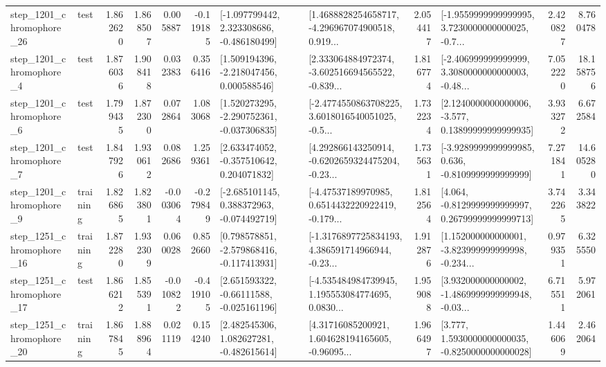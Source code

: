 \begin{tabular}{llrrrrllrlrr}
 step\_1201\_chromophore\_26 &      test &      1.862620 &    1.868507 &      0.005887 & -0.119185 &   [-1.097799442, 2.323308686, -0.486180499] &  [1.4688828254658717, -4.296967074900518, 0.919... &       2.054417 &  [-1.9559999999999995, 3.7230000000000025, -0.7... &            2.420827 &          8.760478 \\
  step\_1201\_chromophore\_4 &      test &      1.876036 &    1.908418 &      0.032383 &  0.356416 &    [1.509194396, -2.218047456, 0.000588546] &  [2.333064884972374, -3.602516694565522, -0.839... &       1.816774 &  [-2.406999999999999, 3.3080000000000003, -0.48... &            7.052220 &         18.158756 \\
  step\_1201\_chromophore\_6 &      test &      1.799435 &    1.872300 &      0.072864 &  1.083068 &   [1.520273295, -2.290752361, -0.037306835] &  [-2.4774550863708225, 3.6018016540051025, -0.5... &       1.732234 &  [2.1240000000000006, -3.577, 0.13899999999999935] &            3.933272 &          6.672584 \\
  step\_1201\_chromophore\_7 &      test &      1.847926 &    1.930612 &      0.082686 &  1.259361 &    [2.633474052, -0.357510642, 0.204071832] &  [4.292866143250914, -0.6202659324475204, -0.23... &       1.735631 &  [-3.9289999999999985, 0.636, -0.8109999999999999] &            7.271841 &         14.605280 \\
  step\_1201\_chromophore\_9 &  training &      1.826865 &    1.823801 &     -0.003064 & -0.279849 &   [-2.685101145, 0.388372963, -0.074492719] &  [-4.47537189970985, 0.6514432220922419, -0.179... &       1.812564 &  [4.064, -0.8129999999999997, 0.26799999999999713] &            3.742265 &          3.343822 \\
 step\_1251\_chromophore\_16 &  training &      1.872280 &    1.932309 &      0.060028 &  0.852660 &   [0.798578851, -2.579868416, -0.117413931] &  [-1.3176897725834193, 4.386591714966944, -0.23... &       1.912876 &  [1.152000000000001, -3.823999999999998, -0.234... &            0.979351 &          6.325550 \\
 step\_1251\_chromophore\_17 &      test &      1.866212 &    1.855391 &     -0.010822 & -0.419105 &    [2.651593322, -0.66111588, -0.025161196] &  [-4.535484984739945, 1.195553084774695, 0.0830... &       1.959088 &  [3.932000000000002, -1.4869999999999948, -0.03... &            6.715511 &          5.972061 \\
 step\_1251\_chromophore\_20 &  training &      1.867845 &    1.888964 &      0.021119 &  0.154240 &    [2.482545306, 1.082627281, -0.482615614] &  [4.31716085200921, 1.604628194165605, -0.96095... &       1.966497 &   [3.777, 1.5930000000000035, -0.8250000000000028] &            1.446069 &          2.462064 \\

\end{tabular}
